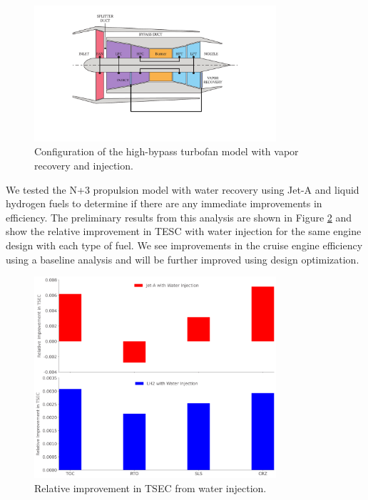 \documentclass[conf]{new-aiaa}
\begin{document}
\begin{figure}[H]
	\centering
	\includegraphics[width=0.8\textwidth]{turbofan_wvr.pdf}
	\caption{Configuration of the high-bypass turbofan model with vapor recovery and injection.}
	\label{fig:hbtf_cycle}
\end{figure}

We tested the N+3 propulsion model with water recovery using Jet-A and liquid hydrogen fuels to determine if there are any immediate improvements in efficiency.
The preliminary results from this analysis are shown in Figure \ref{fig:results} and show the relative improvement in TESC with water injection for the same engine design with each type of fuel.
We see improvements in the cruise engine efficiency using a baseline analysis and will be further improved using design optimization.

\begin{figure}[H]
	\centering
	\includegraphics[width=0.8\textwidth]{JetA-H2_bar_chart_diff.png}
	\caption{Relative improvement in TSEC from water injection.}
	\label{fig:results}
\end{figure}
\end{document}
